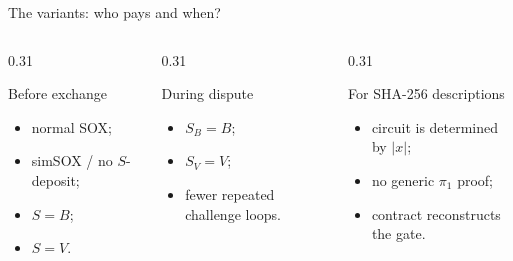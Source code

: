 \documentclass[aspectratio=169,10pt]{beamer}
\newcommand{\simsox}{simSOX}
\begin{document}
\begin{frame}{The variants: who pays and when?}
  \begin{columns}[T,onlytextwidth]
    \begin{column}{0.31\textwidth}
      \begin{block}{Before exchange}
        \begin{itemize}
          \item normal SOX;
          \item \simsox{} / no \(S\)-deposit;
          \item \(S=B\);
          \item \(S=V\).
        \end{itemize}
      \end{block}
    \end{column}
    \begin{column}{0.31\textwidth}
      \begin{block}{During dispute}
        \begin{itemize}
          \item \(S_B=B\);
          \item \(S_V=V\);
          \item fewer repeated challenge loops.
        \end{itemize}
      \end{block}
    \end{column}
    \begin{column}{0.31\textwidth}
      \begin{block}{For SHA-256 descriptions}
        \begin{itemize}
          \item circuit is determined by \(|x|\);
          \item no generic \(\pi_1\) proof;
          \item contract reconstructs the gate.
        \end{itemize}
      \end{block}
    \end{column}
  \end{columns}
\end{frame}
\end{document}
